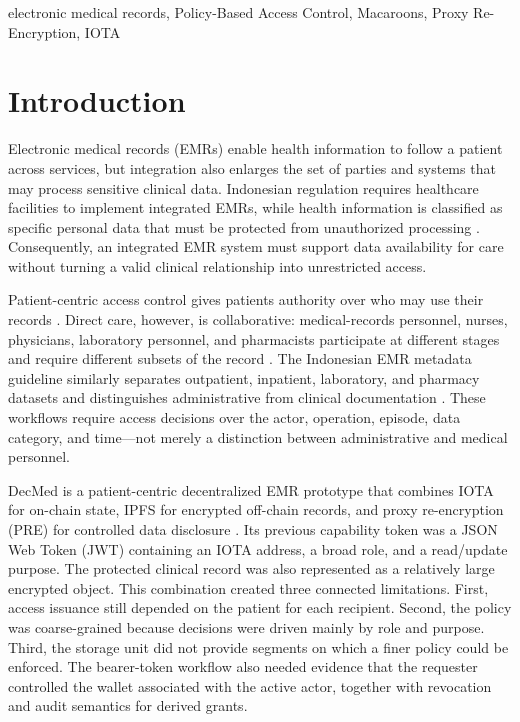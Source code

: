 \documentclass[conference,a4paper,english]{IEEEtran}
\begin{document}
\begin{IEEEkeywords}
	electronic medical records, Policy-Based Access Control, Macaroons, Proxy Re-Encryption, IOTA
\end{IEEEkeywords}
 
\section{Introduction}
\label{sec:introduction}

Electronic medical records (EMRs) enable health information to follow a patient across services, but integration also enlarges the set of parties and systems that may process sensitive clinical data. Indonesian regulation requires healthcare facilities to implement integrated EMRs, while health information is classified as specific personal data that must be protected from unauthorized processing \cite{permenkes24_2022,uu27-2022-pdp}. Consequently, an integrated EMR system must support data availability for care without turning a valid clinical relationship into unrestricted access.

Patient-centric access control gives patients authority over who may use their records \cite{peng2023patientcentric}. Direct care, however, is collaborative: medical-records personnel, nurses, physicians, laboratory personnel, and pharmacists participate at different stages and require different subsets of the record \cite{who2010_interprofessional_collaborative_practice}. The Indonesian EMR metadata guideline similarly separates outpatient, inpatient, laboratory, and pharmacy datasets and distinguishes administrative from clinical documentation \cite{kemenkes1423-2022}. These workflows require access decisions over the actor, operation, episode, data category, and time---not merely a distinction between administrative and medical personnel.

DecMed is a patient-centric decentralized EMR prototype that combines IOTA for on-chain state, IPFS for encrypted off-chain records, and proxy re-encryption (PRE) for controlled data disclosure \cite{sadewa2025decmed}. Its previous capability token was a JSON Web Token (JWT) containing an IOTA address, a broad role, and a read/update purpose. The protected clinical record was also represented as a relatively large encrypted object. This combination created three connected limitations. First, access issuance still depended on the patient for each recipient. Second, the policy was coarse-grained because decisions were driven mainly by role and purpose. Third, the storage unit did not provide segments on which a finer policy could be enforced. The bearer-token workflow also needed evidence that the requester controlled the wallet associated with the active actor, together with revocation and audit semantics for derived grants.
\end{document}
